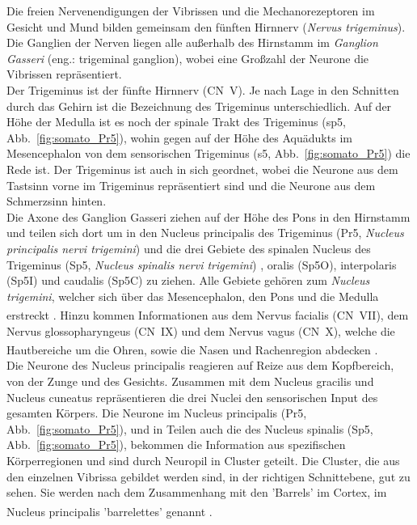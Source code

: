\documentclass[12pt,a4paper,pdftex]{article}
\begin{document}
Die freien Nervenendigungen der Vibrissen und die Mechanorezeptoren im Gesicht und Mund bilden gemeinsam den fünften Hirnnerv (\textit{Nervus trigeminus}). Die Ganglien der Nerven liegen alle außerhalb des Hirnstamm im \textit{Ganglion Gasseri} (eng.: trigeminal ganglion), wobei eine Großzahl der Neurone die Vibrissen repräsentiert.
\\
\noindent
Der Trigeminus ist der fünfte Hirnnerv (CN~V). Je nach Lage in den Schnitten durch das Gehirn ist die Bezeichnung des Trigeminus unterschiedlich. Auf der Höhe der Medulla ist es noch der spinale Trakt des Trigeminus (sp5, Abb.~\ref{fig:somato_Pr5}), wohin gegen auf der Höhe des Aquädukts im Mesencephalon von dem sensorischen Trigeminus  (s5, Abb.~\ref{fig:somato_Pr5}) die Rede ist. Der Trigeminus ist auch in sich geordnet, wobei die Neurone aus dem Tastsinn vorne im Trigeminus repräsentiert sind und die Neurone aus dem Schmerzsinn hinten.
\\
\noindent
Die Axone des Ganglion Gasseri ziehen auf der Höhe des Pons in den Hirnstamm und teilen sich dort um in den Nucleus principalis des Trigeminus (Pr5, \textit{Nucleus principalis nervi trigemini})  und die drei Gebiete des spinalen Nucleus des Trigeminus (Sp5, \textit{Nucleus spinalis nervi trigemini}) , oralis (Sp5O), interpolaris (Sp5I) und caudalis (Sp5C) zu ziehen. Alle Gebiete gehören zum \textit{Nucleus trigemini}, welcher sich über das Mesencephalon, den Pons und die Medulla erstreckt \textsuperscript{\cite[5]{heldmaier2003tierphysiologie}}. 
Hinzu kommen Informationen aus dem Nervus facialis (CN~VII), dem Nervus glossopharyngeus  (CN~IX) und dem Nervus vagus (CN~X), welche die Hautbereiche um die Ohren, sowie die Nasen und Rachenregion abdecken
\textsuperscript{\cite[12]{neurowissenschaften_baer}}.
\\
\noindent Die Neurone des Nucleus principalis reagieren auf Reize aus dem Kopfbereich, von der Zunge und des Gesichts. Zusammen mit dem Nucleus gracilis und Nucleus cuneatus repräsentieren die drei Nuclei den sensorischen Input des gesamten Körpers. Die Neurone im Nucleus principalis (Pr5, Abb.~\ref{fig:somato_Pr5}), und in Teilen auch die des Nucleus spinalis (Sp5, Abb.~\ref{fig:somato_Pr5}), bekommen die Information aus spezifischen Körperregionen und sind durch Neuropil in Cluster geteilt. Die Cluster, die aus den einzelnen Vibrissa gebildet werden sind, in der richtigen Schnittebene, gut zu sehen. Sie werden nach dem Zusammenhang mit den 'Barrels' im Cortex, im Nucleus principalis 'barrelettes' genannt \textsuperscript{\cite[5]{heldmaier2003tierphysiologie}}.
\end{document}
